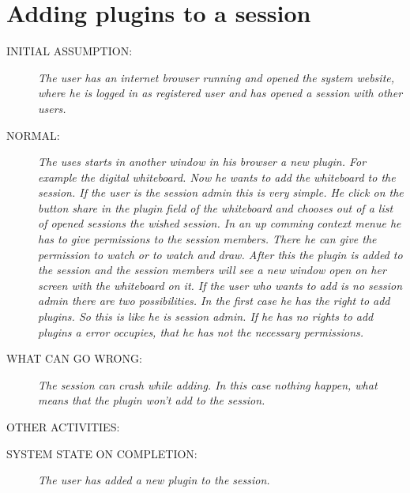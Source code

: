 \section{Adding plugins to a session}
\begin{description}
  \item [INITIAL ASSUMPTION:]
    \textit{The user has an internet browser running and
opened the system website, where he is logged in as registered user and has opened a session with other users.}
  \item [NORMAL:]
    \textit{The uses starts in another window in his browser a new plugin. For example the digital whiteboard. Now he wants to add the whiteboard to the session. If the user is the session admin this is very simple. He click on the button share in the plugin field of the whiteboard and chooses out of a list of opened sessions the wished session. In an up comming context menue he has to give permissions to the session members. There he can give the permission to watch or to watch and draw. After this the plugin is added to the session and the session members will see a new window open on her screen with the whiteboard on it. If the user who wants to add is no session admin there are two possibilities. In the first case he has the right to add plugins. So this is like he is session admin. If he has no rights to add plugins a error occupies, that he has not the necessary permissions.}
  \item [WHAT CAN GO WRONG:]
    \textit{
		The session can crash while adding. In this case nothing happen, what means that the plugin won't add to the session.\\
}
  \item [OTHER ACTIVITIES:]
    \textit{}
  \item [SYSTEM STATE ON COMPLETION:]
    \textit{The user has added a new plugin to the session.}
\end{description}
